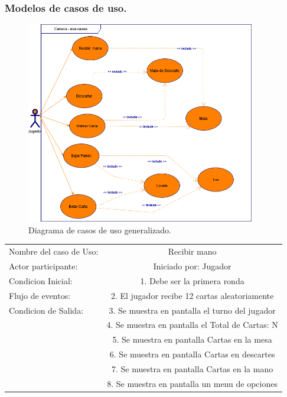 \subsubsection{Modelos de casos de uso.}\label{cap:modelos-casos-uso}
\clearpage
\begin{figure}[H]
    \centering
    \includegraphics[width=10cm]{imagenes/diagramas/casosdeuso.png}
    \caption{Diagrama de casos de uso generalizado.}
\end{figure}
\begin{center}
    \begin{tabular}{ l | c  }
        Nombre del caso de Uso: & Recibir mano                                    \\
        Actor participante:     & Iniciado por: Jugador                           \\\hline
        Condicion Inicial:      & 1. Debe ser la primera ronda                    \\
        Flujo de eventos:       & 2. El jugador recibe 12 cartas aleatoriamente   \\\hline
        Condicion de Salida:    & 3. Se muestra en pantalla el turno del jugador  \\
                                & 4. Se muestra en pantalla el Total de Cartas: N \\
                                & 5. Se muestra en pantalla Cartas en la mesa     \\
                                & 6. Se muestra en pantalla Cartas en descartes   \\
                                & 7. Se muestra en pantalla Cartas en la mano     \\
                                & 8. Se muestra en pantalla un menu de opciones   \\ 
    \end{tabular} \\
\end{center}

